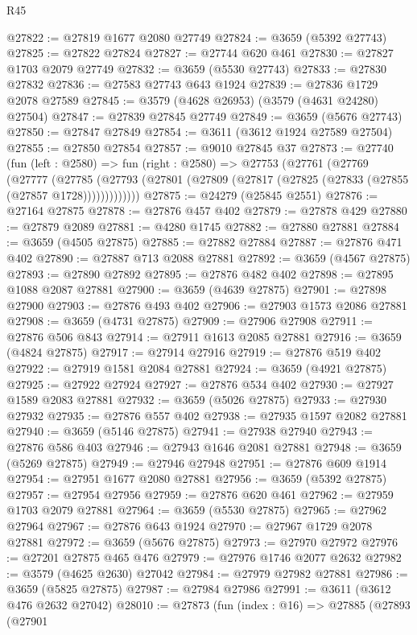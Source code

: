 \begin{lexlean}{R45}
\begin{coremodule}
@27822 := @27819 @1677 @2080 @27749
@27824 := @3659 (@5392 @27743)
@27825 := @27822 @27824
@27827 := @27744 @620 @461
@27830 := @27827 @1703 @2079 @27749
@27832 := @3659 (@5530 @27743)
@27833 := @27830 @27832
@27836 := @27583 @27743 @643 @1924
@27839 := @27836 @1729 @2078 @27589
@27845 := @3579 (@4628 @26953) (@3579 (@4631 @24280) @27504)
@27847 := @27839 @27845 @27749
@27849 := @3659 (@5676 @27743)
@27850 := @27847 @27849
@27854 := @3611 (@3612 @1924 @27589 @27504)
@27855 := @27850 @27854
@27857 := @9010 @27845 @37
@27873 := @27740
    (fun (left : @2580) =>
    fun (right : @2580) =>
    @27753
      (@27761
        (@27769
          (@27777
            (@27785
              (@27793 (@27801 (@27809 (@27817 (@27825 (@27833 (@27855 (@27857 @1728)))))))))))))
@27875 := @24279 (@25845 @2551)
@27876 := @27164 @27875
@27878 := @27876 @457 @402
@27879 := @27878 @429
@27880 := @27879 @2089
@27881 := @4280 @1745
@27882 := @27880 @27881
@27884 := @3659 (@4505 @27875)
@27885 := @27882 @27884
@27887 := @27876 @471 @402
@27890 := @27887 @713 @2088 @27881
@27892 := @3659 (@4567 @27875)
@27893 := @27890 @27892
@27895 := @27876 @482 @402
@27898 := @27895 @1088 @2087 @27881
@27900 := @3659 (@4639 @27875)
@27901 := @27898 @27900
@27903 := @27876 @493 @402
@27906 := @27903 @1573 @2086 @27881
@27908 := @3659 (@4731 @27875)
@27909 := @27906 @27908
@27911 := @27876 @506 @843
@27914 := @27911 @1613 @2085 @27881
@27916 := @3659 (@4824 @27875)
@27917 := @27914 @27916
@27919 := @27876 @519 @402
@27922 := @27919 @1581 @2084 @27881
@27924 := @3659 (@4921 @27875)
@27925 := @27922 @27924
@27927 := @27876 @534 @402
@27930 := @27927 @1589 @2083 @27881
@27932 := @3659 (@5026 @27875)
@27933 := @27930 @27932
@27935 := @27876 @557 @402
@27938 := @27935 @1597 @2082 @27881
@27940 := @3659 (@5146 @27875)
@27941 := @27938 @27940
@27943 := @27876 @586 @403
@27946 := @27943 @1646 @2081 @27881
@27948 := @3659 (@5269 @27875)
@27949 := @27946 @27948
@27951 := @27876 @609 @1914
@27954 := @27951 @1677 @2080 @27881
@27956 := @3659 (@5392 @27875)
@27957 := @27954 @27956
@27959 := @27876 @620 @461
@27962 := @27959 @1703 @2079 @27881
@27964 := @3659 (@5530 @27875)
@27965 := @27962 @27964
@27967 := @27876 @643 @1924
@27970 := @27967 @1729 @2078 @27881
@27972 := @3659 (@5676 @27875)
@27973 := @27970 @27972
@27976 := @27201 @27875 @465 @476
@27979 := @27976 @1746 @2077 @2632
@27982 := @3579 (@4625 @2630) @27042
@27984 := @27979 @27982 @27881
@27986 := @3659 (@5825 @27875)
@27987 := @27984 @27986
@27991 := @3611 (@3612 @476 @2632 @27042)
@28010 := @27873
    (fun (index : @16) =>
    @27885
      (@27893
        (@27901

\end{coremodule}
\end{lexlean}
